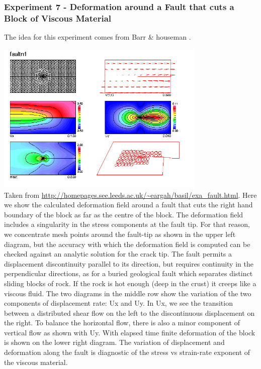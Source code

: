 \newpage
\subsubsection*{Experiment 7 - Deformation around a Fault that cuts a Block of Viscous Material}

The idea for this experiment comes from Barr \& houseman \cite{baho92,baho96}.


\begin{center}
\includegraphics[width=10cm]{python_codes/fieldstone_87/images/baho}\\
{\captionfont Taken from 
\url{http://homepages.see.leeds.ac.uk/~eargah/basil/exa_fault.html}. 
Here we show the calculated deformation field around a fault that cuts the right 
hand boundary of the block as far as the centre of the block.  The deformation field 
includes a singularity in the stress components at the fault tip.  For that reason, 
we concentrate mesh points around the fault-tip as shown in the upper left diagram, 
but the accuracy with which the deformation field is computed can be checked against 
an analytic solution for the crack tip.  The fault permits a displacement discontinuity 
parallel to its direction, but requires continuity in the perpendicular directions, 
as for a buried geological fault which separates distinct sliding blocks of rock.  
If the rock is hot enough (deep in the crust) it creeps like a viscous fluid. 
The two diagrams in the middle row show the variation of the two components of displacement rate: 
Ux and Uy.  In Ux, we see the transition between a distributed shear flow on the left to the 
discontinuous displacement on the right.  To balance the horizontal flow, there is also a minor 
component of vertical flow as shown with Uy.  With elapsed time finite deformation of the block 
is shown on the lower right diagram.  The variation of displacement and deformation along the fault 
is diagnostic of the stress vs strain-rate exponent of the viscous material. 
}
\end{center}

